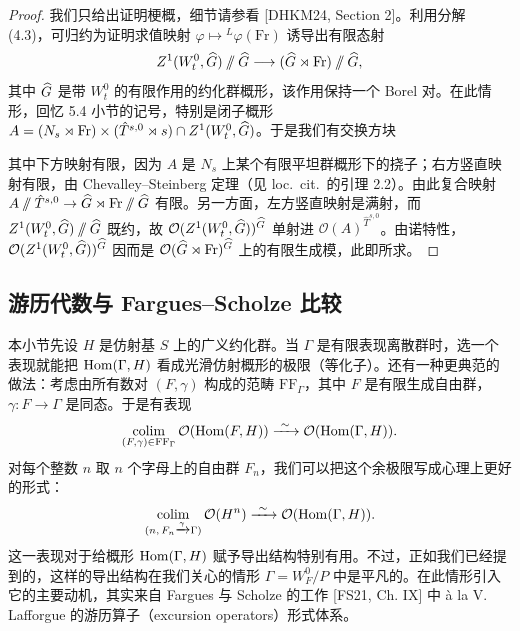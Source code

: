 \begin{proof}
我们只给出证明梗概，细节请参看 [DHKM24, Section 2]。利用分解 (4.3)，可归约为证明求值映射 $\varphi\mapsto{}^L\varphi(\mathrm{Fr})$ 诱导出有限态射
\[
Z^1(W_t^0,\widehat{G})\sslash\widehat{G}\longrightarrow(\widehat{G}\rtimes\mathrm{Fr})\sslash\widehat{G},
\]
其中 $\widehat{G}$ 是带 $W_t^0$ 的有限作用的约化群概形，该作用保持一个 Borel 对。在此情形，回忆 5.4 小节的记号，特别是闭子概形
$A=(N_s\rtimes\mathrm{Fr})\times(\hat T^{s,0}\rtimes s)\cap Z^1(W_t^0,\widehat{G})$。于是我们有交换方块
\begin{center}
\end{center}
其中下方映射有限，因为 $A$ 是 $N_s$ 上某个有限平坦群概形下的挠子；右方竖直映射有限，由 Chevalley--Steinberg 定理（见 loc.\ cit.\ 的引理 2.2）。由此复合映射 $A\sslash\hat T^{s,0}\to\widehat{G}\rtimes\mathrm{Fr}\sslash\widehat{G}$ 有限。另一方面，左方竖直映射是满射，而 $Z^1(W_t^0,\widehat{G})\sslash\widehat{G}$ 既约，故 $\mathcal O(Z^1(W_t^0,\widehat{G}))^{\widehat{G}}$ 单射进 $\mathcal O(A)^{\hat T^{s,0}}$。由诺特性，$\mathcal O(Z^1(W_t^0,\widehat{G}))^{\widehat{G}}$ 因而是 $\mathcal O(\widehat{G}\rtimes\mathrm{Fr})^{\widehat{G}}$ 上的有限生成模，此即所求。
\end{proof}

\subsection{游历代数与 Fargues--Scholze 比较}
本小节先设 $H$ 是仿射基 $S$ 上的广义约化群。当 $\Gamma$ 是有限表现离散群时，选一个表现就能把 $\operatorname{Hom}(\Gamma,H)$ 看成光滑仿射概形的极限（等化子）。还有一种更典范的做法：考虑由所有数对 $(F,\gamma)$ 构成的范畴 $\mathrm{FF}_\Gamma$，其中 $F$ 是有限生成自由群，$\gamma:F\to\Gamma$ 是同态。于是有表现
\[
\operatorname*{colim}_{(F,\gamma)\in\mathrm{FF}_\Gamma}\mathcal O(\operatorname{Hom}(F,H))\xrightarrow{\ \sim\ }\mathcal O(\operatorname{Hom}(\Gamma,H)).
\]
对每个整数 $n$ 取 $n$ 个字母上的自由群 $F_n$，我们可以把这个余极限写成心理上更好的形式：
\[
\operatorname*{colim}_{(n,\,F_n\xrightarrow{\gamma}\Gamma)}\mathcal O(H^n)\xrightarrow{\ \sim\ }\mathcal O(\operatorname{Hom}(\Gamma,H)).
\]
这一表现对于给概形 $\operatorname{Hom}(\Gamma,H)$ 赋予导出结构特别有用。不过，正如我们已经提到的，这样的导出结构在我们关心的情形 $\Gamma=W_F^0/P$ 中是平凡的。在此情形引入它的主要动机，其实来自 Fargues 与 Scholze 的工作 [FS21, Ch. IX] 中 à la V. Lafforgue 的游历算子（excursion operators）形式体系。

